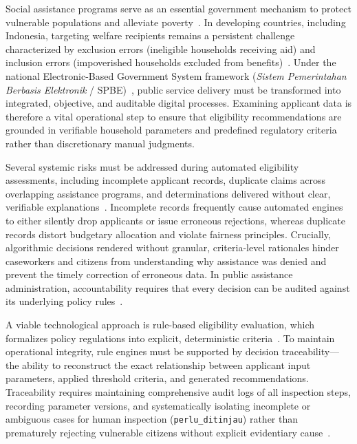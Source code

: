 \documentclass[runningheads]{llncs}
\begin{document}
Social assistance programs serve as an essential government mechanism to protect vulnerable populations and alleviate poverty~\cite{oecd2019social}. In developing countries, including Indonesia, targeting welfare recipients remains a persistent challenge characterized by exclusion errors (ineligible households receiving aid) and inclusion errors (impoverished households excluded from benefits)~\cite{alatas2012targeting,hanna2018universal}. Under the national Electronic-Based Government System framework (\textit{Sistem Pemerintahan Berbasis Elektronik} / SPBE)~\cite{rachmawati2024policy}, public service delivery must be transformed into integrated, objective, and auditable digital processes. Examining applicant data is therefore a vital operational step to ensure that eligibility recommendations are grounded in verifiable household parameters and predefined regulatory criteria rather than discretionary manual judgments.

Several systemic risks must be addressed during automated eligibility assessments, including incomplete applicant records, duplicate claims across overlapping assistance programs, and determinations delivered without clear, verifiable explanations~\cite{lindert2020sourcebook,busuioc2021accountable}. Incomplete records frequently cause automated engines to either silently drop applicants or issue erroneous rejections, whereas duplicate records distort budgetary allocation and violate fairness principles. Crucially, algorithmic decisions rendered without granular, criteria-level rationales hinder caseworkers and citizens from understanding why assistance was denied and prevent the timely correction of erroneous data. In public assistance administration, accountability requires that every decision can be audited against its underlying policy rules~\cite{sunny2025neuro}.

A viable technological approach is rule-based eligibility evaluation, which formalizes policy regulations into explicit, deterministic criteria~\cite{lopez2022envisioning}. To maintain operational integrity, rule engines must be supported by decision traceability---the ability to reconstruct the exact relationship between applicant input parameters, applied threshold criteria, and generated recommendations. Traceability requires maintaining comprehensive audit logs of all inspection steps, recording parameter versions, and systematically isolating incomplete or ambiguous cases for human inspection (\texttt{perlu\_ditinjau}) rather than prematurely rejecting vulnerable citizens without explicit evidentiary cause~\cite{cobbe2021reviewable}.
\end{document}
